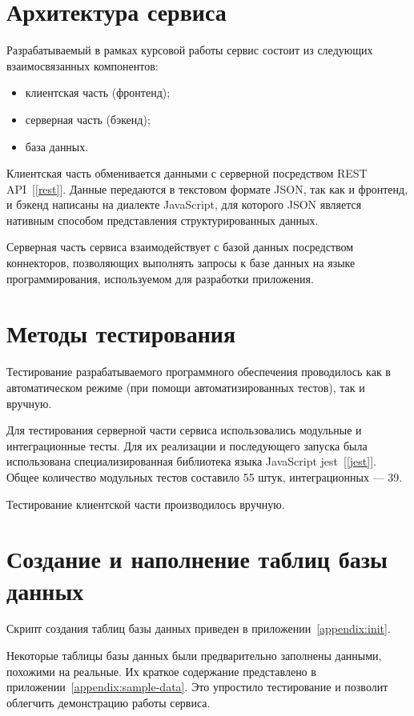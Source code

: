 \pagebreak
\section{Архитектура сервиса}

Разрабатываемый в рамках курсовой работы сервис состоит из следующих взаимосвязанных компонентов:

\begin{itemize}
    \item клиентская часть (фронтенд);
    \item серверная часть (бэкенд);
    \item база данных.
\end{itemize}

Клиентская часть обменивается данными с серверной посредством REST API~[\ref{rest}]. Данные передаются в текстовом формате JSON, так как и фронтенд, и бэкенд написаны на диалекте JavaScript, для которого JSON является нативным способом представления структурированных данных.

Серверная часть сервиса взаимодействует с базой данных посредством коннекторов, позволяющих выполнять запросы к базе данных на языке программирования, используемом для разработки приложения.

\section{Методы тестирования}

Тестирование разрабатываемого программного обеспечения проводилось как в автоматическом режиме (при помощи автоматизированных тестов), так и вручную.

Для тестирования серверной части сервиса использовались модульные и интеграционные тесты. Для их реализации и последующего запуска была использована специализированная библиотека языка JavaScript jest~[\ref{jest}]. Общее количество модульных тестов составило 55 штук, интеграционных --- 39.

Тестирование клиентской части производилось вручную.

\section{Создание и наполнение таблиц базы данных}

Скрипт создания таблиц базы данных приведен в приложении~\ref{appendix:init}.

Некоторые таблицы базы данных были предварительно заполнены данными, похожими на реальные. Их краткое содержание представлено в приложении~\ref{appendix:sample-data}. Это упростило тестирование и позволит облегчить демонстрацию работы сервиса.

